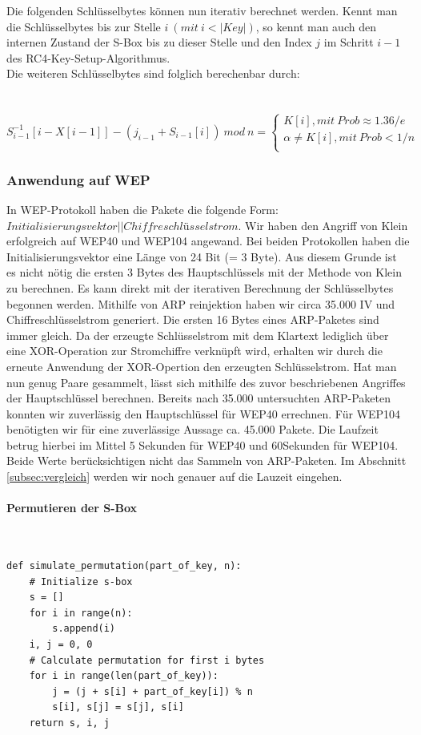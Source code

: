 \documentclass[10pt,a4paper]{article}
\begin{document}
Die folgenden Schlüsselbytes können nun iterativ berechnet werden. Kennt man die Schlüsselbytes bis zur Stelle $i\ ( mit\  i < |Key|)$, so kennt man auch den internen Zustand der S-Box bis zu dieser Stelle und den Index $j$ im Schritt $i - 1$ des RC4-Key-Setup-Algorithmus. \\
Die weiteren Schlüsselbytes sind folglich berechenbar durch:\\\\\
$S^{-1}_{i-1}[i-X[i-1]] - (j_{i-1}+S_{i-1}[i]) \ mod \ n = \begin{cases} K[i], mit \ Prob \approx 1.36/e \\ \alpha \neq K[i], mit \ Prob < 1/n \\\end{cases}$ 

\subsubsection{Anwendung auf WEP}
In WEP-Protokoll haben die Pakete die folgende Form: $Initialisierungsvektor || Chiffreschlüsselstrom $. Wir haben den Angriff von Klein erfolgreich auf WEP40 und WEP104 angewand. Bei beiden Protokollen haben die Initialisierungsvektor eine Länge von 24 Bit (= 3 Byte). Aus diesem Grunde ist es nicht nötig die ersten 3 Bytes des Hauptschlüssels mit der Methode von Klein zu berechnen. Es kann direkt mit der iterativen Berechnung der Schlüsselbytes begonnen werden. Mithilfe von ARP reinjektion haben wir circa 35.000 IV und Chiffreschlüsselstrom generiert. Die ersten 16 Bytes eines ARP-Paketes sind immer gleich. Da der erzeugte Schlüsselstrom mit dem Klartext lediglich über eine XOR-Operation zur Stromchiffre verknüpft wird, erhalten wir durch die erneute Anwendung der XOR-Opertion den erzeugten Schlüsselstrom. Hat man nun genug Paare gesammelt, lässt sich mithilfe des zuvor beschriebenen Angriffes der Hauptschlüssel berechnen. Bereits nach 35.000 untersuchten ARP-Paketen konnten wir zuverlässig den Hauptschlüssel für WEP40 errechnen. Für WEP104 benötigten wir für eine zuverlässige Aussage ca. 45.000 Pakete. Die Laufzeit betrug hierbei im Mittel 5 Sekunden für WEP40 und 60Sekunden für WEP104. Beide Werte berücksichtigen nicht das Sammeln von ARP-Paketen. Im Abschnitt \ref{subsec:vergleich} werden wir noch genauer auf die Lauzeit eingehen.

\paragraph{Permutieren der S-Box}\ 
\begin{lstlisting}
def simulate_permutation(part_of_key, n):
    # Initialize s-box
    s = []
    for i in range(n):
        s.append(i)
    i, j = 0, 0
    # Calculate permutation for first i bytes
    for i in range(len(part_of_key)):
        j = (j + s[i] + part_of_key[i]) % n
        s[i], s[j] = s[j], s[i]
    return s, i, j
\end{lstlisting}
\end{document}
